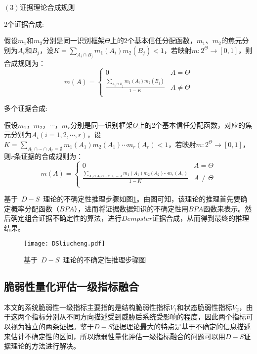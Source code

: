 $(3)$证据理论合成规则

2个证据合成:

假设$m_1$和$m_2$分别是同一识别框架$\Theta$上的2个基本信任分配函数，$m_1$、$m_2$的焦元分别为$A_i$和$B_j$，设$K=\sum_{A_i\cap B_j}m_1(A_i)m_2(B_j)<1$，若映射$m:2^{\Theta}\to[0,1]$，则合成规则为：
\begin{equation}\label{equ:chap4:Index23}
m(A)= \begin{cases}
        0 & A=\Theta\\
        \displaystyle\frac{\sum_{A_i\cap B_j}m_1(A_i)m_2(B_j)}{1-K} & A\neq \Theta\\
      \end{cases}
\end{equation}

多个证据合成:

假设$m_1$，$m_2$，$\cdots$，$m_r$分别是同一识别框架$\Theta$上的2个基本信任分配函数，对应的焦元分别为$A_i(i=1,2,\cdots,r)$，设$K=\sum_{A_1\cap \cdots \cap A_r = \emptyset}m_1(A_1)m_2(A_1)\cdots m_r(A_r)<1$，若映射$m:2^{\Theta}\to[0,1]$，则$r$条证据的合成规则为：
\begin{equation}\label{equ:chap4:Index24}
m(A)= \begin{cases}
        0 & A=\Theta\\
        \displaystyle\frac{\sum_{A_1\cap A_2\cap \cdots \cap A_r=A}m_1(A_1)m_2(A_2)\cdots m_r(A_r)}{1-K} & A\neq \Theta\\
      \end{cases}
\end{equation}

基于~$D-S$~理论的不确定性推理步骤如图\ref{fig:DSliucheng}。由图可知，该理论的推理首先要确定概率分配函数（$BPA$），进而将证据数据知识的不确定性用$BPA$函数来表示。然后确定组合证据不确定性的算法，进行$Dempster$证据合成，从而得到最终的推理结果。
\begin{figure}[H] %
  \centering
  \texttt{[image: DSliucheng.pdf]}
  \caption{基于~$D-S$~理论的不确定性推理步骤图}
  \label{fig:DSliucheng}
\end{figure}
\subsection{脆弱性量化评估一级指标融合}
\label{sec:DSdistri}
本文的系统脆弱性一级指标主要指的是结构脆弱性指标$V_1$和状态脆弱性指标$V_2$，由于这两个指标分别从不同方向描述受到威胁后系统受影响的程度，因此两个指标可以视为独立的两条证据。鉴于$D-S$证据理论最大的特点是基于不确定的信息描述来估计不确定性的区间，所以脆弱性量化评估一级指标融合的问题可以用$D-S$证据理论的方法进行解决。


